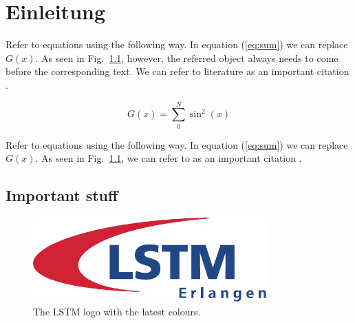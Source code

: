\chapter{Einleitung}
\label{einleitung}

Refer to equations using the following way. In equation (\ref{eq:sum}) we can replace $G(x)$. As seen in Fig.\ \ref{fig:logo}, however, the referred object always needs to come before the corresponding text. We can refer to literature \cite{schlatter_orlu_2010} as an important citation \citep[see for instance][and others]{schlatter_orlu_2010}.

\lipsum[2-4]

\begin{equation}\label{eq:sum}
G(x) = \sum_0^N \sin^2(x) 
\end{equation}

Refer to equations using the following way. In equation (\ref{eq:sum}) we can replace $G(x)$. As seen in Fig.\ \ref{fig:logo}, we can refer to \cite{schlatter_orlu_2010} as an important citation \citep[see for instance][and others]{schlatter_orlu_2010}.

\section{Important stuff}

\lipsum[2-4]


\begin{figure}[!ht]
\centering
\includegraphics[width=0.8\textwidth]{bilder/LSTM_Logo.pdf}
\caption{The LSTM logo with the latest colours.}\label{fig:logo}
\end{figure}

\lipsum[2-4]
